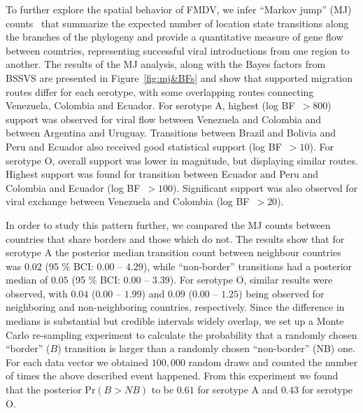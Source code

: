 \documentclass[10pt]{article}
\begin{document}
To further explore the spatial behavior of FMDV, we infer
``Markov jump'' (MJ) counts~\cite{Minin2008} that summarize the expected number of location state transitions along the  branches of the phylogeny and provide a quantitative measure of gene flow between countries, representing successful viral introductions from one region to another.
The results of the MJ analysis, along with the Bayes factors from BSSVS are presented in Figure~\ref{fig:mj&BFs} and show that supported migration routes differ for each serotype, with some overlapping routes connecting Venezuela, Colombia and Ecuador.
For serotype A, highest (log BF~$>800$) support was observed for viral flow between Venezuela and Colombia and between Argentina and Uruguay.
Transitions between Brazil and Bolivia and Peru and Ecuador also received good statistical support (log BF~$>10$).
For serotype O, overall support was lower in magnitude, but displaying similar routes.
Highest support was found for transition between Ecuador and Peru and Colombia and Ecuador (log BF~$>100$). Significant support was also observed for viral exchange between Venezuela and Colombia (log BF~$>20$). 


In order to study this pattern further, we compared the MJ counts between countries that share borders and those which do not.
The results show that for serotype A the posterior median transition count between neighbour countries was $0.02$ (95 \% BCI: $0.00$ -- $4.29$), while ``non-border'' transitions had a posterior median of $0.05$ (95 \% BCI: $0.00$ --  $3.39$).
For serotype O, similar results were observed, with $0.04$ ($0.00$ -- $1.99$) and $0.09$ ($0.00$ -- $1.25$) being observed for neighboring and non-neighboring countries, respectively.
Since the difference in medians is substantial but credible intervals widely overlap, we set up a Monte Carlo re-sampling experiment to calculate the probability that a randomly chosen ``border'' ($B$) transition is larger than a randomly chosen ``non-border'' (NB) one. For each data vector we obtained $100,000$ random draws and counted the number of times the above described event happened. From this experiment we found that the posterior $\mbox{Pr}(B>NB)$  to be $0.61$ for serotype A and $0.43$ for serotype O.
\end{document}
